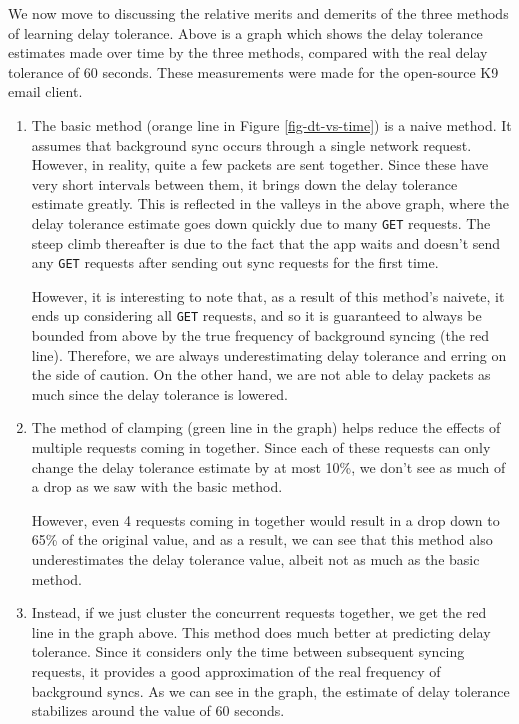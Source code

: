 \documentclass[12pt, fleqn]{article}
\begin{document}
We now move to discussing the relative merits and demerits of the three methods 
of learning delay tolerance. Above is a graph which shows the delay tolerance 
estimates made over time by the three methods, compared with the real delay tolerance
of 60 seconds. These measurements were made for the open-source K9 email client.
\begin{enumerate}
  \item The basic method (orange line in Figure \ref{fig-dt-vs-time}) is a naive method. It assumes that background sync 
  occurs through a single network request. However, in reality, quite a few packets are sent 
  together. Since these have very short intervals between them, it brings down 
  the delay tolerance estimate greatly. This is reflected in the valleys in the above
  graph, where the delay tolerance estimate goes down quickly due to many 
  \texttt{GET} requests. The steep climb thereafter is due to the fact that the 
  app waits and doesn't send any \texttt{GET} requests after sending out sync requests 
  for the first time.
  
  However, it is interesting to note that, as a result of this method's naivete, 
  it ends up considering all \texttt{GET} requests, and so it is guaranteed to 
  always be bounded from above by the true frequency of background syncing (the red line). 
  Therefore, we are always underestimating delay tolerance and erring on the side 
  of caution. On the other hand, we are not able to delay packets as much since 
  the delay tolerance is lowered.  
  
  \item The method of clamping (green line in the graph) helps reduce the effects of multiple requests 
  coming in together. Since each of these requests can only change the delay 
  tolerance estimate by at most 10\%, we don't see as much of a drop as we saw 
  with the basic method. 
  
  However, even 4 requests coming in together would result in a drop down to 
  65\% of the original value, and as a result, we can see that this method also 
  underestimates the delay tolerance value, albeit not as much as the basic 
  method.
  
  \item Instead, if we just cluster the concurrent requests together, we get the 
  red line in the graph above. This method does much better at 
  predicting delay tolerance. Since it considers only the time between 
  subsequent syncing requests, it provides a good approximation of the real 
  frequency of background syncs. As we can see in the graph, the estimate of 
  delay tolerance stabilizes around the value of 60 seconds.
  

\end{enumerate}
\end{document}
